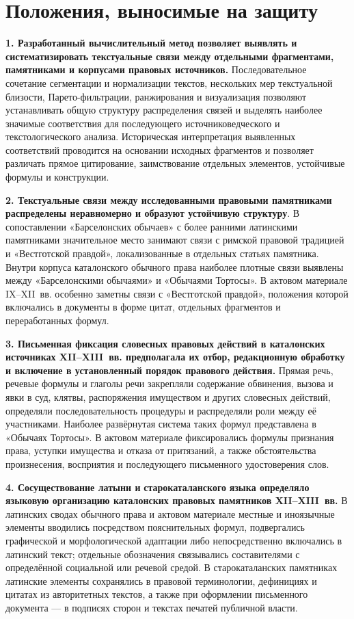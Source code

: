 \section*{Положения, выносимые на защиту}

\textbf{1. Разработанный вычислительный метод позволяет выявлять и систематизировать текстуальные связи между отдельными фрагментами, памятниками и корпусами правовых источников. }Последовательное сочетание сегментации и нормализации текстов, нескольких мер текстуальной близости, Парето-фильтрации, ранжирования и визуализация позволяют устанавливать общую структуру распределения связей и выделять наиболее значимые соответствия для последующего источниковедческого и текстологического анализа. Историческая интерпретация выявленных соответствий проводится на основании исходных фрагментов и позволяет различать прямое цитирование, заимствование отдельных элементов, устойчивые формулы и конструкции.

\textbf{2. Текстуальные связи между исследованными правовыми памятниками распределены неравномерно и образуют устойчивую структуру}. В сопоставлении «Барселонских обычаев» с более ранними латинскими памятниками значительное место занимают связи с римской правовой традицией и «Вестготской правдой», локализованные в отдельных статьях памятника. Внутри корпуса каталонского обычного права наиболее плотные связи выявлены между «Барселонскими обычаями» и «Обычаями Тортосы». В актовом материале IX--XII~вв. особенно заметны связи с «Вестготской правдой», положения которой включались в документы в форме цитат, отдельных фрагментов и переработанных формул.

\textbf{3. Письменная фиксация словесных правовых действий в каталонских источниках XII--XIII~вв. предполагала их отбор, редакционную обработку и включение в установленный порядок правового действия. }Прямая речь, речевые формулы и глаголы речи закрепляли содержание обвинения, вызова и явки в суд, клятвы, распоряжения имуществом и других словесных действий, определяли последовательность процедуры и распределяли роли между её участниками. Наиболее развёрнутая система таких формул представлена в «Обычаях Тортосы». В актовом материале фиксировались формулы признания права, уступки имущества и отказа от притязаний, а также обстоятельства произнесения, восприятия и последующего письменного удостоверения слов.

\textbf{4. Сосуществование латыни и }\textbf{старокаталанского}\textbf{ языка определяло языковую организацию каталонских правовых памятников XII--XIII~вв. }В латинских сводах обычного права и актовом материале местные и иноязычные элементы вводились посредством пояснительных формул, подвергались графической и морфологической адаптации либо непосредственно включались в латинский текст; отдельные обозначения связывались составителями с определённой социальной или речевой средой. В старокаталанских памятниках латинские элементы сохранялись в правовой терминологии, дефинициях и цитатах из авторитетных текстов, а также при оформлении письменного документа --- в подписях сторон и текстах печатей публичной власти.

